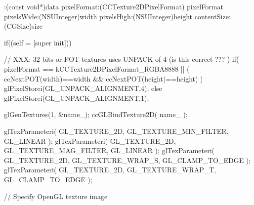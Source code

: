 \begin{DoxyCode}
                   :(const void*)data pixelFormat:(CCTexture2DPixelFormat)
      pixelFormat pixelsWide:(NSUInteger)width pixelsHigh:(NSUInteger)height 
      contentSize:(CGSize)size
{
        if((self = [super init])) {
                
                
                // XXX: 32 bits or POT textures uses UNPACK of 4 (is this
       correct ??? )
                if( pixelFormat == kCCTexture2DPixelFormat_RGBA8888 || ( 
      ccNextPOT(width)==width && ccNextPOT(height)==height) )
                        glPixelStorei(GL_UNPACK_ALIGNMENT,4);
                else
                        glPixelStorei(GL_UNPACK_ALIGNMENT,1);

                glGenTextures(1, &name_);
                ccGLBindTexture2D( name_ );
                
                glTexParameteri( GL_TEXTURE_2D, GL_TEXTURE_MIN_FILTER, 
      GL_LINEAR );
                glTexParameteri( GL_TEXTURE_2D, GL_TEXTURE_MAG_FILTER, 
      GL_LINEAR );
                glTexParameteri( GL_TEXTURE_2D, GL_TEXTURE_WRAP_S, 
      GL_CLAMP_TO_EDGE );
                glTexParameteri( GL_TEXTURE_2D, GL_TEXTURE_WRAP_T, 
      GL_CLAMP_TO_EDGE );

                // Specify OpenGL texture image

}}
\end{DoxyCode}

